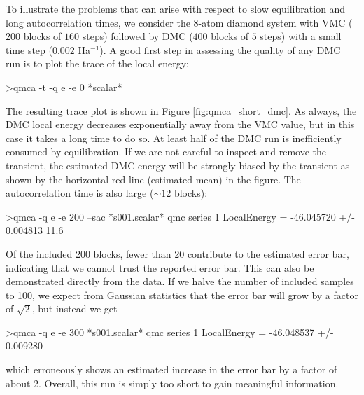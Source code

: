 To illustrate the problems that can arise with respect to slow 
equilibration and long autocorrelation times, we consider the 
8-atom diamond system with VMC ($200$ blocks of $160$ steps) followed 
by DMC ($400$ blocks of $5$ steps) with a small time step ($0.002$ Ha$^{-1}$).
A good first step in assessing the quality of any DMC run is 
to plot the trace of the local energy:
\begin{shade}
>qmca -t -q e -e 0 *scalar*
\end{shade}
\noindent
The resulting trace plot is shown in Figure \ref{fig:qmca_short_dmc}.  
As always, the DMC local energy decreases exponentially away from 
the VMC value, but in this case it takes a long time to do so.  
At least half of the DMC run is inefficiently consumed by equilibration.
If we are not careful to inspect and remove the transient, the estimated 
DMC energy will be strongly biased by the transient as shown by the 
horizontal red line (estimated mean) in the figure.  The autocorrelation 
time is also large ($\sim 12$ blocks):
\begin{shade}
>qmca -q e -e 200 --sac *s001.scalar*
qmc  series 1  LocalEnergy           =  -46.045720 +/- 0.004813   11.6
\end{shade}
\noindent
Of the included 200 blocks, fewer than 20 contribute to the estimated error 
bar, indicating that we cannot trust the reported error bar.  
This can also be demonstrated directly from the data.  If we halve the number 
of included samples to 100, we expect from Gaussian statistics 
that the error bar will grow by a factor of $\sqrt{2}$, but instead we 
get
\begin{shade}
>qmca -q e -e 300 *s001.scalar*
qmc  series 1  LocalEnergy           =  -46.048537 +/- 0.009280
\end{shade}
\noindent
which erroneously shows an estimated increase in the error bar by a factor 
of about 2.  Overall, this run is simply too short to gain meaningful 
information.  

